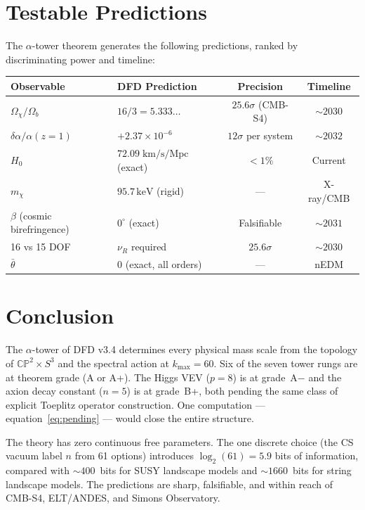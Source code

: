 \documentclass[11pt]{article}
\theoremstyle{definition}
\theoremstyle{remark}
\newcommand{\CP}{\mathbb{CP}}
\newcommand{\keV}{\,\mathrm{keV}}
\begin{document}
\section{Testable Predictions}
\label{sec:tests}

The $\alpha$-tower theorem generates the following predictions, ranked
by discriminating power and timeline:

\begin{center}
\renewcommand{\arraystretch}{1.4}
\begin{tabular}{llcc}
\toprule
\textbf{Observable} & \textbf{DFD Prediction} &
  \textbf{Precision} & \textbf{Timeline} \\
\midrule
$\Omega_\chi/\Omega_b$ & $16/3 = 5.333\ldots$
  & $25.6\sigma$ (CMB-S4) & $\sim 2030$ \\
$\delta\alpha/\alpha(z{=}1)$ & $+2.37 \times 10^{-6}$
  & $12\sigma$ per system & $\sim 2032$ \\
$H_0$ & $72.09\;\mathrm{km/s/Mpc}$ (exact)
  & $<1\%$ & Current \\
$m_\chi$ & $95.7\keV$ (rigid)
  & --- & X-ray/CMB \\
$\beta$ (cosmic birefringence) & $0^{\circ}$ (exact)
  & Falsifiable & $\sim 2031$ \\
16 vs 15 DOF & $\nu_R$ required
  & $25.6\sigma$ & $\sim 2030$ \\
$\bar\theta$ & $0$ (exact, all orders)
  & --- & nEDM \\
\bottomrule
\end{tabular}
\end{center}


\section{Conclusion}
\label{sec:conclusion}

The $\alpha$-tower of DFD v3.4 determines every physical mass scale
from the topology of $\CP^2 \times S^3$ and the spectral action at
$k_{\max} = 60$.  Six of the seven tower rungs are at theorem grade
(A or A+).  The Higgs VEV ($p = 8$) is at grade~A$-$ and the axion
decay constant ($n = 5$) is at grade~B+, both pending the same class
of explicit Toeplitz operator construction.  One computation ---
equation~\eqref{eq:pending} --- would close the entire structure.

The theory has zero continuous free parameters.  The one discrete
choice (the CS vacuum label $n$ from 61 options) introduces
$\log_2(61) = 5.9$ bits of information, compared with
$\sim 400$~bits for SUSY landscape models and $\sim 1660$~bits for
string landscape models.  The predictions are sharp, falsifiable,
and within reach of CMB-S4, ELT/ANDES, and Simons Observatory.
\end{document}
